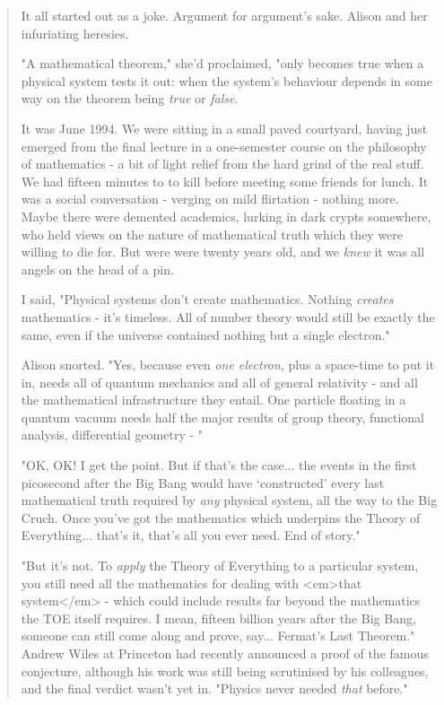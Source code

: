 

\begin{quote}
     It all started out as a joke.  Argument for argument's sake.  Alison
     and her infuriating heresies.  

     "A mathematical theorem," she'd proclaimed, "only becomes true when a 
     physical system tests it out: when the system's behaviour depends in 
     some way on the theorem being \emph{true} or \emph{false}.

     It was June 1994.  We were sitting in a small paved courtyard, 
     having just emerged from the final lecture in a one-semester
     course on the philosophy of mathematics - a bit of light relief
     from the hard grind of the real stuff.  We had fifteen minutes to
     to kill before meeting some friends for lunch.  It was a social
     conversation - verging on mild flirtation - nothing more.  Maybe
     there were demented academics, lurking in dark crypts somewhere,
     who held views on the nature of mathematical truth which they were
     willing to die for.  But were were twenty years old, and we \emph{knew}
     it was all angels on the head of a pin.  

     I said, "Physical systems don't create mathematics.  Nothing
     \emph{creates} mathematics - it's timeless.  All of number theory would
     still be exactly the same, even if the universe contained nothing
     but a single electron."

     Alison snorted.  "Yes, because even \emph{one electron}, 
     plus a space-time to put it in, needs all of quantum mechanics and all of
     general relativity - and all the mathematical infrastructure they
     entail.  One particle floating in a quantum vacuum needs half the
     major results of group theory, functional analysis, differential
     geometry - "

     "OK, OK!  I get the point.  But if that's the case... the events in
     the first picosecond after the Big Bang would have `constructed'
     every last mathematical truth required by \emph{any} physical system,
     all the way to the Big Cruch.  Once you've got the mathematics
     which underpins the Theory of Everything... that's it, that's all
     you ever need.  End of story."

     "But it's not.  To \emph{apply} the Theory of Everything to a particular
     system, you still need all the mathematics for dealing with <em>that
     system</em> - which could include results far beyond the mathematics 
     the TOE itself requires.  I mean, fifteen billion years after the
     Big Bang, someone can still come along and prove, say... Fermat's
     Last Theorem."  Andrew Wiles at Princeton had recently announced
     a proof of the famous conjecture, although his work was still being
     scrutinised by his colleagues, and the final verdict wasn't yet in.
     "Physics never needed \emph{that} before."


\end{quote}
